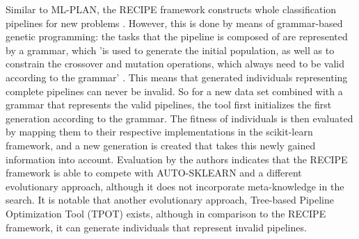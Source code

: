 Similar to ML-PLAN, the RECIPE framework constructs whole classification pipelines for new problems \cite{DBLP:conf/eurogp/SaPOP17}. However, this is done by means of grammar-based genetic programming: the tasks that the pipeline is composed of are represented by a grammar, which 'is used to generate the initial population, as well as to constrain the crossover and mutation operations, which always need to be valid according to the grammar' \cite{DBLP:conf/eurogp/SaPOP17}. This means that generated individuals representing complete pipelines can never be invalid. So for a new data set combined with a grammar that represents the valid pipelines, the tool first initializes the first generation according to the grammar. The fitness of individuals is then evaluated by mapping them to their respective implementations in the scikit-learn framework, and a new generation is created that takes this newly gained information into account. Evaluation by the authors indicates that the RECIPE framework is able to compete with AUTO-SKLEARN and a different evolutionary approach, although it does not incorporate meta-knowledge in the search. It is notable that another evolutionary approach, Tree-based Pipeline Optimization Tool (TPOT) \cite{olson2016automating} exists, although in comparison to the RECIPE framework, it can generate individuals that represent invalid pipelines.